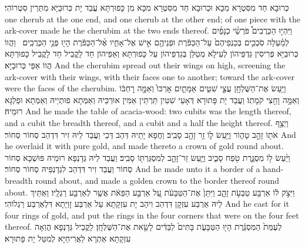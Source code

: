 {כְּרוּבָא חַד מִסִּטְרָא מִכָּא וּכְרוּבָא חַד מִסִּטְרָא מִכָּא מִן כָּפוּרְתָּא עֲבַד יָת כְּרוּבַיָּא מִתְּרֵין סִטְרוֹהִי׃}
{one cherub at the one end, and one cherub at the other end; of one piece with the ark-cover made he the cherubim at the two ends thereof.}{}
{וַיִּהְי֣וּ הַכְּרֻבִים֩ פֹּרְשֵׂ֨י כְנָפַ֜יִם לְמַ֗עְלָה סֹֽכְכִ֤ים בְּכַנְפֵיהֶם֙ עַל־הַכַּפֹּ֔רֶת וּפְנֵיהֶ֖ם אִ֣ישׁ אֶל־אָחִ֑יו אֶ֨ל־הַכַּפֹּ֔רֶת הָי֖וּ פְּנֵ֥י הַכְּרֻבִֽים׃ \petucha }
{וַהֲווֹ כְּרוּבַיָּא פְּרִיסִין גַּדְפֵּיהוֹן לְעֵילָא מְטַלַּן בְּגַדְפֵּיהוֹן עַל כָּפוּרְתָּא וְאַפֵּיהוֹן חַד לָקֳבֵיל חַד לָקֳבֵיל כָּפוּרְתָּא הֲווֹ אַפֵּי כְּרוּבַיָּא׃}
{And the cherubim spread out their wings on high, screening the ark-cover with their wings, with their faces one to another; toward the ark-cover were the faces of the cherubim.}{}
{וַיַּ֥עַשׂ אֶת־הַשֻּׁלְחָ֖ן עֲצֵ֣י שִׁטִּ֑ים אַמָּתַ֤יִם אׇרְכּוֹ֙ וְאַמָּ֣ה רׇחְבּ֔וֹ וְאַמָּ֥ה וָחֵ֖צִי קֹמָתֽוֹ׃}
{וַעֲבַד יָת פָּתוּרָא דְּאָעֵי שִׁטִּין תַּרְתֵּין אַמִּין אוּרְכֵּיהּ וְאַמְּתָא פוּתְיֵיהּ וְאַמְּתָא וּפַלְגָּא רוּמֵיהּ׃}
{And he made the table of acacia-wood: two cubits was the length thereof, and a cubit the breadth thereof, and a cubit and a half the height thereof.}{}
{וַיְצַ֥ף אֹת֖וֹ זָהָ֣ב טָה֑וֹר וַיַּ֥עַשׂ ל֛וֹ זֵ֥ר זָהָ֖ב סָבִֽיב׃}
{וַחֲפָא יָתֵיהּ דְּהַב דְּכֵי וַעֲבַד לֵיהּ זִיר דִּדְהַב סְחוֹר סְחוֹר׃}
{And he overlaid it with pure gold, and made thereto a crown of gold round about.}{}
{וַיַּ֨עַשׂ ל֥וֹ מִסְגֶּ֛רֶת טֹ֖פַח סָבִ֑יב וַיַּ֧עַשׂ זֵר־זָהָ֛ב לְמִסְגַּרְתּ֖וֹ סָבִֽיב׃}
{וַעֲבַד לֵיהּ גְּדָנְפָא רוּמֵיהּ פּוּשְׁכָּא סְחוֹר סְחוֹר וַעֲבַד זִיר דִּדְהַב לִגְדָנְפֵיהּ סְחוֹר סְחוֹר׃}
{And he made unto it a border of a hand-breadth round about, and made a golden crown to the border thereof round about.}{}
{וַיִּצֹ֣ק ל֔וֹ אַרְבַּ֖ע טַבְּעֹ֣ת זָהָ֑ב וַיִּתֵּן֙ אֶת־הַטַּבָּעֹ֔ת עַ֚ל אַרְבַּ֣ע הַפֵּאֹ֔ת אֲשֶׁ֖ר לְאַרְבַּ֥ע רַגְלָֽיו׃}
{וְאַתֵּיךְ לֵיהּ אַרְבַּע עִזְקָן דִּדְהַב וִיהַב יָת עִזְקָתָא עַל אַרְבַּע זָוְיָתָא דִּלְאַרְבַּע רַגְלוֹהִי׃}
{And he cast for it four rings of gold, and put the rings in the four corners that were on the four feet thereof.}{}
{לְעֻמַּת֙ הַמִּסְגֶּ֔רֶת הָי֖וּ הַטַּבָּעֹ֑ת בָּתִּים֙ לַבַּדִּ֔ים לָשֵׂ֖את אֶת־הַשֻּׁלְחָֽן׃}
{לָקֳבֵיל גְּדָנְפָא הֲוַאָה עִזְקָתָא אַתְרָא לַאֲרִיחַיָּא לְמִטַּל יָת פָּתוּרָא׃}
